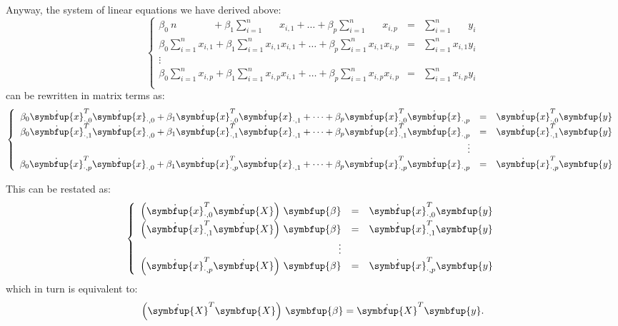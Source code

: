 \documentclass[10pt,b5paper,krantz1]{krantz}
\renewcommand{\mathbf}[1]{\symbfup{#1}}
\renewcommand{\boldsymbol}[1]{\symbfup{#1}}
\begin{document}
Anyway, the system of linear equations we have derived above:
\[
\left\{
\begin{array}{rcl}
\beta_0\ n\phantom{\sum_{i=1}^n x} + \beta_1\sum_{i=1}^n \phantom{x_{i,0}}  x_{i,1}+\dots+\beta_p \sum_{i=1}^n \phantom{x_{i,0}}  x_{i,p} &=&\sum_{i=1}^n\phantom{x_{i,0}} y_i \\
\beta_0 \sum_{i=1}^n x_{i,1} + \beta_1\sum_{i=1}^n x_{i,1}  x_{i,1}+\dots+\beta_p \sum_{i=1}^n x_{i,1}  x_{i,p} &=&\sum_{i=1}^n x_{i,1} y_i \\
\vdots\\
\beta_0 \sum_{i=1}^n x_{i,p} + \beta_1\sum_{i=1}^n x_{i,p}  x_{i,1}+\dots+\beta_p \sum_{i=1}^n x_{i,p}  x_{i,p} &=&\sum_{i=1}^n x_{i,p} y_i \\
\end{array}
\right.
\]
can be rewritten in matrix terms as:
\[
\left\{
\begin{array}{rcl}
\beta_0 \dot{\mathbf{x}}_{\cdot,0}^T \dot{\mathbf{x}}_{\cdot,0} + \beta_1 \dot{\mathbf{x}}_{\cdot,0}^T \dot{\mathbf{x}}_{\cdot,1}+\dots+\beta_p \dot{\mathbf{x}}_{\cdot,0}^T \dot{\mathbf{x}}_{\cdot,p} &=& \dot{\mathbf{x}}_{\cdot,0}^T \mathbf{y} \\
\beta_0 \dot{\mathbf{x}}_{\cdot,1}^T \dot{\mathbf{x}}_{\cdot,0} + \beta_1 \dot{\mathbf{x}}_{\cdot,1}^T \dot{\mathbf{x}}_{\cdot,1}+\dots+\beta_p \dot{\mathbf{x}}_{\cdot,1}^T \dot{\mathbf{x}}_{\cdot,p} &=& \dot{\mathbf{x}}_{\cdot,1}^T \mathbf{y} \\
\vdots\\
\beta_0 \dot{\mathbf{x}}_{\cdot,p}^T \dot{\mathbf{x}}_{\cdot,0} + \beta_1 \dot{\mathbf{x}}_{\cdot,p}^T \dot{\mathbf{x}}_{\cdot,1}+\dots+\beta_p \dot{\mathbf{x}}_{\cdot,p}^T \dot{\mathbf{x}}_{\cdot,p} &=& \dot{\mathbf{x}}_{\cdot,p}^T \mathbf{y}\\
\end{array}
\right.
\]

This can be restated as:
\[
\left\{
\begin{array}{rcl}
\left(\dot{\mathbf{x}}_{\cdot,0}^T \dot{\mathbf{X}}\right)\, \boldsymbol\beta &=& \dot{\mathbf{x}}_{\cdot,0}^T \mathbf{y} \\
\left(\dot{\mathbf{x}}_{\cdot,1}^T \dot{\mathbf{X}}\right)\, \boldsymbol\beta  &=& \dot{\mathbf{x}}_{\cdot,1}^T \mathbf{y} \\
\vdots\\
\left(\dot{\mathbf{x}}_{\cdot,p}^T \dot{\mathbf{X}}\right)\, \boldsymbol\beta  &=& \dot{\mathbf{x}}_{\cdot,p}^T \mathbf{y}\\
\end{array}
\right.
\]
which in turn is equivalent to:
\[
\left(\dot{\mathbf{X}}^T\mathbf{X}\right)\,\boldsymbol\beta = \dot{\mathbf{X}}^T\mathbf{y}.
\]
\end{document}
